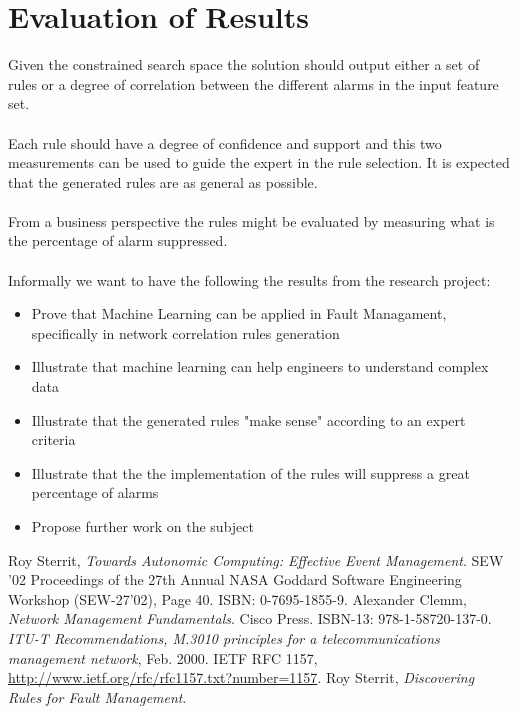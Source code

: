 \documentclass[10pt,a4paper]{article}
\begin{document}
 \section{Evaluation of Results}

Given the constrained search space the solution should output either a set of rules or a degree of correlation between the different alarms in the input feature set.
\\\\
Each rule should have a degree of confidence and support and this two measurements can be used to guide the expert in the rule selection. It is expected that the generated rules are as general as possible.
\\\\
From a business perspective the rules might be evaluated by measuring what is the percentage of alarm suppressed. 
\\\\
Informally we want to have the following the results from the research project:
\begin{itemize}
\item Prove that Machine Learning can be applied in Fault Managament, specifically in network correlation rules generation
\item Illustrate that machine learning can help engineers to understand complex data
\item Illustrate that the generated rules "make sense" according to an expert criteria
\item Illustrate that the the implementation of the rules will suppress a great percentage of alarms
\item Propose further work on the subject
\end{itemize}


 \begin{thebibliography}{9}
 Roy Sterrit,
        \emph{Towards Autonomic Computing: Effective Event Management}.
        SEW '02 Proceedings of the 27th Annual NASA Goddard Software Engineering Workshop (SEW-27'02), Page 40. ISBN: 0-7695-1855-9.
 Alexander Clemm,
        \emph{Network Management Fundamentals}.
       Cisco Press. ISBN-13: 978-1-58720-137-0.
\emph{ITU-T Recommendations, M.3010 principles for a
telecommunications management network}, Feb. 2000.
IETF RFC 1157, \url{http://www.ietf.org/rfc/rfc1157.txt?number=1157}.
 Roy Sterrit,
        \emph{Discovering Rules for Fault Management}.
 \end{thebibliography}
\end{document}
